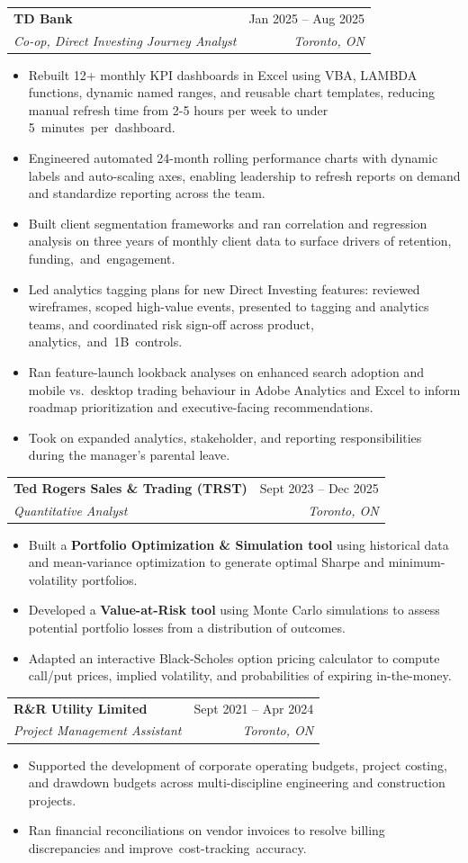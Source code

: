 \documentclass[letterpaper,11pt]{article}
\makeatletter
\newcommand{\resumeItem}[1]{%
  \item\small{#1 \vspace{-2pt}}
}
\newcommand{\resumeSubheading}[4]{%
  \needspace{5\baselineskip}%
  \vspace{-1pt}\item
    \begin{tabular*}{0.97\textwidth}[t]{l@{\extracolsep{\fill}}r}
      \textbf{#1} & {\small #2} \\
      \textit{\small#3} & \textit{\small #4} \\
    \end{tabular*}\vspace{-6pt}
}
\newcommand{\resumeItemListStart}{\begin{itemize}[itemsep=1pt, parsep=0pt, topsep=2pt]}
\newcommand{\resumeItemListEnd}{\end{itemize}\vspace{-4pt}}
\makeatother
\begin{document}
    \resumeSubheading
      {TD Bank}{Jan 2025 -- Aug 2025}
      {Co-op, Direct Investing Journey Analyst}{Toronto, ON}
      \resumeItemListStart
        \resumeItem{Rebuilt 12+ monthly KPI dashboards in Excel using VBA, LAMBDA functions, dynamic named ranges, and reusable chart templates, reducing manual refresh time from 2-5 hours per week to under \mbox{5 minutes per dashboard.}}
        \resumeItem{Engineered automated 24-month rolling performance charts with dynamic labels and auto-scaling axes, enabling leadership to refresh reports on demand and standardize reporting across the team.}
        \resumeItem{Built client segmentation frameworks and ran correlation and regression analysis on three years of monthly client data to surface drivers of retention, \mbox{funding, and engagement.}}
        \resumeItem{Led analytics tagging plans for new Direct Investing features: reviewed wireframes, scoped high-value events, presented to tagging and analytics teams, and coordinated risk sign-off across product, \mbox{analytics, and 1B controls.}}
        \resumeItem{Ran feature-launch lookback analyses on enhanced search adoption and mobile vs.\ desktop trading behaviour in Adobe Analytics and Excel to inform roadmap prioritization and executive-facing recommendations.}
        \resumeItem{Took on expanded analytics, stakeholder, and reporting responsibilities during the manager's parental leave.}
      \resumeItemListEnd

    \resumeSubheading
      {Ted Rogers Sales \& Trading (TRST)}{Sept 2023 -- Dec 2025}
      {Quantitative Analyst}{Toronto, ON}
      \resumeItemListStart
        \resumeItem{Built a \textbf{Portfolio Optimization \& Simulation tool} using historical data and mean-variance optimization to generate optimal Sharpe and minimum-volatility portfolios.}
        \resumeItem{Developed a \textbf{Value-at-Risk tool} using Monte Carlo simulations to assess potential portfolio losses from a distribution of outcomes.}
        \resumeItem{Adapted an interactive Black-Scholes option pricing calculator to compute call/put prices, implied volatility, and probabilities of expiring in-the-money.}
      \resumeItemListEnd

    \resumeSubheading
      {R\&R Utility Limited}{Sept 2021 -- Apr 2024}
      {Project Management Assistant}{Toronto, ON}
      \resumeItemListStart
        \resumeItem{Supported the development of corporate operating budgets, project costing, and drawdown budgets across multi-discipline engineering and construction projects.}
        \resumeItem{Ran financial reconciliations on vendor invoices to resolve billing discrepancies and \mbox{improve cost-tracking accuracy.}}
      \resumeItemListEnd
\end{document}
